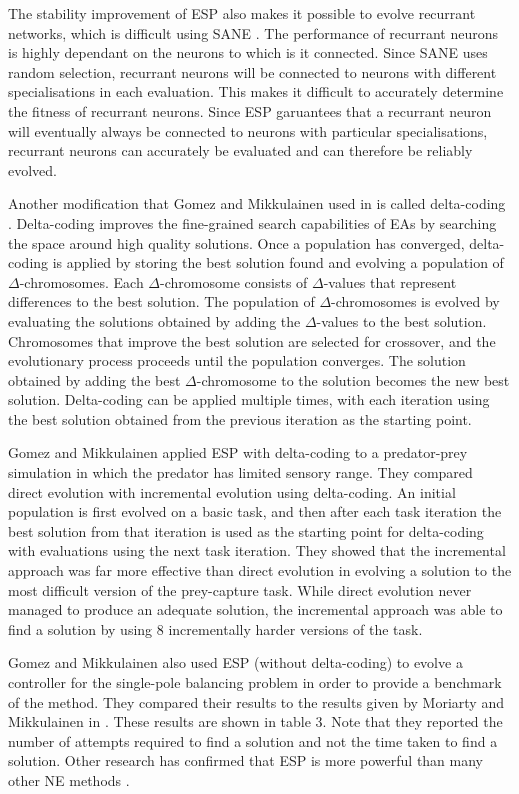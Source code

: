 \documentclass[12pt]{article} %
\begin{document}
The stability improvement of ESP also makes it possible to evolve recurrant networks, which is difficult using SANE \cite{Gomez1997}. The performance of recurrant neurons is highly dependant on the neurons to which is it connected. Since SANE uses random selection, recurrant neurons will be connected to neurons with different specialisations in each evaluation. This makes it difficult to accurately determine the fitness of recurrant neurons. Since ESP garuantees that a recurrant neuron will eventually always be connected to neurons with particular specialisations, recurrant neurons can accurately be evaluated and can therefore be reliably evolved.

Another modification that Gomez and Mikkulainen used in \cite{Gomez1997} is called delta-coding \cite{Whitley1991}. Delta-coding improves the fine-grained search capabilities of EAs by searching the space around high quality solutions. Once a population has converged, delta-coding is applied by storing the best solution found and evolving a population of $\Delta$-chromosomes. Each $\Delta$-chromosome consists of $\Delta$-values that represent differences to the best solution. The population of $\Delta$-chromosomes is evolved by evaluating the solutions obtained by adding the $\Delta$-values to the best solution. Chromosomes that improve the best solution are selected for crossover, and the evolutionary process proceeds until the population converges. The solution obtained by adding the best $\Delta$-chromosome to the solution becomes the new best solution. Delta-coding can be applied multiple times, with each iteration using the best solution obtained from the previous iteration as the starting point.

Gomez and Mikkulainen applied ESP with delta-coding to a predator-prey simulation in which the predator has limited sensory range. They compared direct evolution with incremental evolution using delta-coding. An initial population is first evolved on a basic task, and then after each task iteration the best solution from that iteration is used as the starting point for delta-coding with evaluations using the next task iteration. They showed that the incremental approach was far more effective than direct evolution in evolving a solution to the most difficult version of the prey-capture task. While direct evolution never managed to produce an adequate solution, the incremental approach was able to find a solution by using 8 incrementally harder versions of the task.

Gomez and Mikkulainen also used ESP (without delta-coding) to evolve a controller for the single-pole balancing problem in order to provide a benchmark of the method. They compared their results to the results given by Moriarty and Mikkulainen in \cite{Moriarty1996}. These results are shown in table 3. Note that they reported the number of attempts required to find a solution and not the time taken to find a solution. Other research has confirmed that ESP is more powerful than many other NE methods \cite{Yong2001}.
\end{document}
